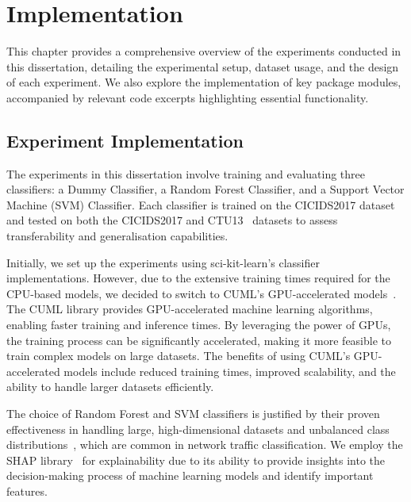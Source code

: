 \chapter{Implementation}\label{chap:implementation}

This chapter provides a comprehensive overview of the experiments conducted in this dissertation, detailing the experimental setup, dataset usage, and the design of each experiment. We also explore the implementation of key package modules, accompanied by relevant code excerpts highlighting essential functionality.

\section{Experiment Implementation}\label{sec:experimental-setup}
The experiments in this dissertation involve training and evaluating three classifiers: a Dummy Classifier, a Random Forest Classifier, and a Support Vector Machine (SVM) Classifier. Each classifier is trained on the CICIDS2017 dataset~\cite{sharafaldin2018toward} and tested on both the CICIDS2017 and CTU13~\cite{garcia2014empirical} datasets to assess transferability and generalisation capabilities.

Initially, we set up the experiments using sci-kit-learn's classifier implementations. However, due to the extensive training times required for the CPU-based models, we decided to switch to CUML's GPU-accelerated models~\cite{raschka2020machine}. The CUML library provides GPU-accelerated machine learning algorithms, enabling faster training and inference times. By leveraging the power of GPUs, the training process can be significantly accelerated, making it more feasible to train complex models on large datasets. The benefits of using CUML's GPU-accelerated models include reduced training times, improved scalability, and the ability to handle larger datasets efficiently.

The choice of Random Forest and SVM classifiers is justified by their proven effectiveness in handling large, high-dimensional datasets and unbalanced class distributions~\cite{farnaaz2016random, teng2017svm}, which are common in network traffic classification. We employ the SHAP library~\cite{lundberg2017unified} for explainability due to its ability to provide insights into the decision-making process of machine learning models and identify important features.

